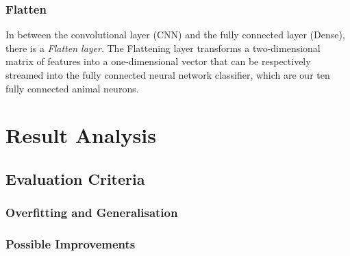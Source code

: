 \documentclass[journal]{IEEEtran}
\begin{document}
\subsubsection{Flatten}
In between the convolutional layer (CNN) and the fully connected layer (Dense), there is a \textit{Flatten layer}. The Flattening layer transforms a two-dimensional matrix of features into a one-dimensional vector that can be respectively streamed into the fully connected neural network classifier, which are our ten fully connected animal neurons. \\
%
%
\section{Result Analysis}
\subsection{Evaluation Criteria}
\subsubsection{Overfitting and Generalisation}
\subsubsection{Possible Improvements}
\ifCLASSOPTIONcaptionsoff
  \newpage
\fi


\vfill
\end{document}
